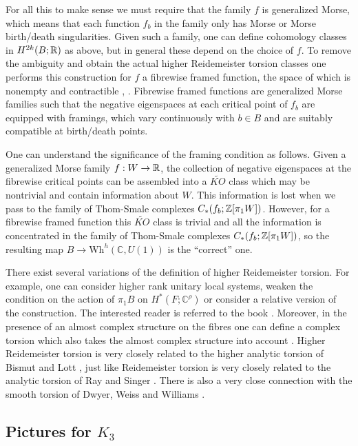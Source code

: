 \documentclass[11pt]{article}
\numberwithin{equation}{section}\providecommand{\dpl}{\displaystyle}
\newcommand{\Wh}{\mathrm{Wh}}
\theoremstyle{plain}
\theoremstyle{definition}
\newcommand{\bC}{\mathbb{C}}\newcommand{\bD}{\mathbb{D}}
\begin{document}
For all this to make sense we must require that the family $f$ is generalized Morse, which means that each function $f_b$ in the family only has Morse or Morse birth/death singularities. Given such a family, one can define cohomology classes in $H^{2k}(B;\mathbb{R})$ as above, but in general these depend on the choice of $f$. To remove the ambiguity and obtain the actual higher Reidemeister torsion classes one performs this construction for $f$ a fibrewise framed function, the space of which is nonempty and contractible \cite{I87}, \cite{EM12}. Fibrewise framed functions are generalized Morse families such that the negative eigenspaces at each critical point of $f_b$ are equipped with framings, which vary continuously with $b \in B$ and are suitably compatible at birth/death points.

One can understand the significance of the framing condition as follows. Given a generalized Morse family $f:W \to \mathbb{R}$, the collection of negative eigenspaces at the fibrewise critical points can be assembled into a $\widetilde{KO}$ class which may be nontrivial and contain information about $W$. This information is lost when we pass to the family of Thom-Smale complexes $C_*(f_b;\mathbb{Z}[\pi_1W])$. However, for a fibrewise framed function this $\widetilde{KO}$ class is trivial and all the information is concentrated in the family of Thom-Smale complexes $C_*(f_b;\mathbb{Z}[\pi_1W])$, so the resulting map $B \to \Wh^h(\bC,U(1))$ is the ``correct'' one.

There exist several variations of the definition of higher Reidemeister torsion. For example, one can consider higher rank unitary local systems, weaken the condition on the action of $\pi_1B$ on $H^*(F;\bC^\rho)$ or consider a relative version of the construction. The interested reader is referred to the book \cite{I02}. Moreover, in the presence of an almost complex structure on the fibres one can define a complex torsion which also takes the almost complex structure into account \cite{I05}. Higher Reidemeister torsion is very closely related to the higher analytic torsion of Bismut and Lott \cite{BL95}, just like Reidemeister torsion is very closely related to the analytic torsion of Ray and Singer \cite{RS71}. There is also a very close connection with the smooth torsion of Dwyer, Weiss and Williams \cite{DWW03}.

\subsection{Pictures for $K_3$}\label{pictures for K3}
\end{document}
